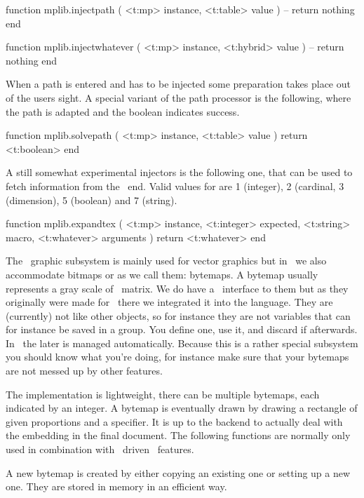 \starttyping[option=LUA]
function mplib.injectpath ( <t:mp> instance,  <t:table> value )
    -- return nothing
end
\stoptyping

\starttyping[option=LUA]
function mplib.injectwhatever ( <t:mp> instance, <t:hybrid> value )
    -- return nothing
end
\stoptyping

When a path is entered and has to be injected some preparation takes place out of
the users sight. A special variant of the path processor is the following, where
the path is adapted and the boolean indicates success.

\starttyping[option=LUA]
function mplib.solvepath ( <t:mp> instance, <t:table> value )
    return <t:boolean>
end
\stoptyping

A still somewhat experimental injectors is the following one, that can be used to
fetch information from the \TEX\ end. Valid values for  are 1
(integer), 2 (cardinal, 3 (dimension), 5 (boolean) and 7 (string).

\starttyping[option=LUA]
function mplib.expandtex (
    <t:mp>       instance,
    <t:integer>  expected,
    <t:string>   macro,
    <t:whatever> arguments
)
    return <t:whatever>
end
\stoptyping

\stopsection

\startsection[title=Bytemaps]

The \METAPOST\ graphic subsystem is mainly used for vector graphics but in
\LUAMETATEX\ we also accommodate bitmaps or as we call them: bytemaps. A bytemap
usually represents a gray scale of \RGB\ matrix. We do have a \LUA\ interface to
them but as they originally were made for \METAPOST\ there we integrated it into
the language. They are (currently) not like other objects, so for instance they
are not variables that can for instance be saved in a group. You define one, use
it, and discard if afterwards. In \CONTEXT\ the later is managed automatically.
Because this is a rather special subsystem you should know what you're doing, for
instance make sure that your bytemaps are not messed up by other features.

The implementation is lightweight, there can be multiple bytemaps, each indicated
by an integer. A bytemap is eventually drawn by drawing a rectangle of given
proportions and a  specifier. It is up to the backend to
actually deal with the embedding in the final document. The following functions
are normally only used in combination with \LUA\ driven \LUAMETAFUN\ features.

A new bytemap is created by either copying an existing one or setting up a new
one. They are stored in memory in an efficient way.

